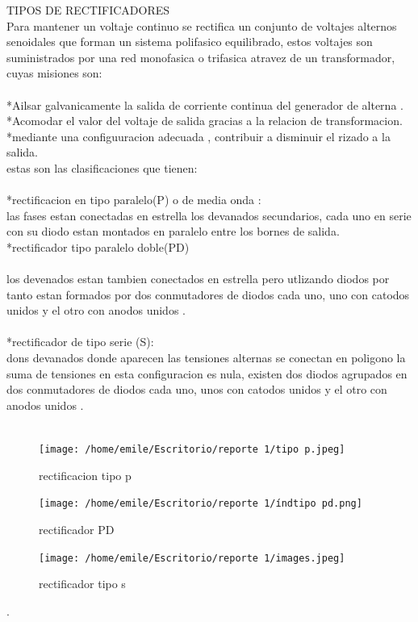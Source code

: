 \documentclass[12pt]{article}
\begin{document}
TIPOS DE RECTIFICADORES
\\Para mantener un voltaje continuo se rectifica un conjunto de voltajes alternos senoidales que forman un sistema polifasico equilibrado, estos voltajes son suministrados por una red monofasica o trifasica atravez de un transformador, cuyas misiones son:\\
\\*Ailsar galvanicamente la salida de corriente continua del generador de alterna .
\\*Acomodar el valor del voltaje de salida gracias a la relacion de transformacion.
\\*mediante una configuuracion adecuada , contribuir a disminuir el rizado a la salida.
\\estas son las clasificaciones que tienen:\\\\
*rectificacion en tipo paralelo(P) o de media onda :\\ las fases estan conectadas en estrella los devanados secundarios, cada uno en serie con su diodo estan montados en paralelo entre los bornes de salida.
\\*rectificador tipo paralelo doble(PD)\\\\
los devenados estan tambien conectados en estrella pero utlizando diodos por tanto estan formados por dos conmutadores de diodos cada uno, uno con catodos unidos y el otro con anodos unidos .\\\\
*rectificador de tipo serie (S):
\\dons devanados donde aparecen las tensiones alternas se conectan en poligono la suma de tensiones en esta configuracion es nula, existen dos diodos  agrupados  en dos conmutadores de diodos cada uno, unos con catodos unidos y el otro con anodos unidos .\\\\

 \begin{figure}[htp]
\centering
\texttt{[image: /home/emile/Escritorio/reporte 1/tipo p.jpeg]}
\caption{rectificacion tipo p}
\label{rectificacion tipo p }
\end{figure}
\begin{figure}[htp]
\centering
\texttt{[image: /home/emile/Escritorio/reporte 1/índtipo pd.png]}
\caption{rectificador PD}
\label{rectificador PD}
\end{figure}
\begin{figure}[htp]
\centering
\texttt{[image: /home/emile/Escritorio/reporte 1/images.jpeg]}
\caption{rectificador tipo s }
\label{rectificador tipo s}
\end{figure}.
 
\end{document}
